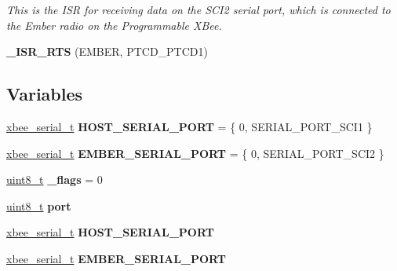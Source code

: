 \begin{DoxyCompactItemize}
\begin{DoxyCompactList}\small\item\em This is the I\-S\-R for receiving data on the S\-C\-I2 serial port, which is connected to the Ember radio on the Programmable X\-Bee. \end{DoxyCompactList}\item 
\hypertarget{group__hal__hcs08_ga24980a5b377ce3ec80b1a5b59b93c894}{{\bfseries \-\_\-\-I\-S\-R\-\_\-\-R\-T\-S} (E\-M\-B\-E\-R, P\-T\-C\-D\-\_\-\-P\-T\-C\-D1)}\label{group__hal__hcs08_ga24980a5b377ce3ec80b1a5b59b93c894}

\end{DoxyCompactItemize}
\subsection*{Variables}
\begin{DoxyCompactItemize}
\item 
\hypertarget{group__hal__hcs08_ga7b94b1cffbda721cef09c47910312334}{\hyperlink{structxbee__serial__t}{xbee\-\_\-serial\-\_\-t} {\bfseries H\-O\-S\-T\-\_\-\-S\-E\-R\-I\-A\-L\-\_\-\-P\-O\-R\-T} = \{ 0, S\-E\-R\-I\-A\-L\-\_\-\-P\-O\-R\-T\-\_\-\-S\-C\-I1 \}}\label{group__hal__hcs08_ga7b94b1cffbda721cef09c47910312334}

\item 
\hypertarget{group__hal__hcs08_gabde5add8d0a8b02079f3bcfd077a6040}{\hyperlink{structxbee__serial__t}{xbee\-\_\-serial\-\_\-t} {\bfseries E\-M\-B\-E\-R\-\_\-\-S\-E\-R\-I\-A\-L\-\_\-\-P\-O\-R\-T} = \{ 0, S\-E\-R\-I\-A\-L\-\_\-\-P\-O\-R\-T\-\_\-\-S\-C\-I2 \}}\label{group__hal__hcs08_gabde5add8d0a8b02079f3bcfd077a6040}

\item 
\hypertarget{group__hal__hcs08_ga5629227e4392e5086f50519e78e4c973}{\hyperlink{group__hal_gae1affc9ca37cfb624959c866a73f83c2}{uint8\-\_\-t} {\bfseries \-\_\-flags} = 0}\label{group__hal__hcs08_ga5629227e4392e5086f50519e78e4c973}

\item 
\hypertarget{group__hal__hcs08_ga2fa54f9024782843172506fadbee2ac8}{\hyperlink{group__hal_gae1affc9ca37cfb624959c866a73f83c2}{uint8\-\_\-t} {\bfseries port}}\label{group__hal__hcs08_ga2fa54f9024782843172506fadbee2ac8}

\item 
\hypertarget{group__hal__hcs08_ga7b94b1cffbda721cef09c47910312334}{\hyperlink{structxbee__serial__t}{xbee\-\_\-serial\-\_\-t} {\bfseries H\-O\-S\-T\-\_\-\-S\-E\-R\-I\-A\-L\-\_\-\-P\-O\-R\-T}}\label{group__hal__hcs08_ga7b94b1cffbda721cef09c47910312334}

\item 
\hypertarget{group__hal__hcs08_gabde5add8d0a8b02079f3bcfd077a6040}{\hyperlink{structxbee__serial__t}{xbee\-\_\-serial\-\_\-t} {\bfseries E\-M\-B\-E\-R\-\_\-\-S\-E\-R\-I\-A\-L\-\_\-\-P\-O\-R\-T}}\label{group__hal__hcs08_gabde5add8d0a8b02079f3bcfd077a6040}

\end{DoxyCompactItemize}


